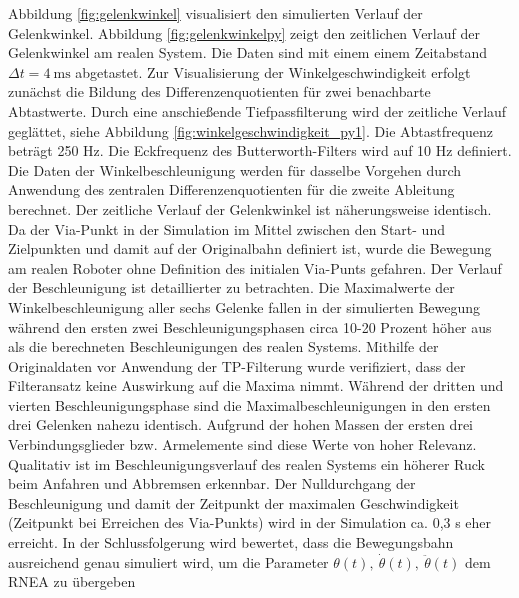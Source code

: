 Abbildung \ref{fig:gelenkwinkel}  visualisiert den simulierten  Verlauf der Gelenkwinkel. Abbildung \ref{fig:gelenkwinkelpy} zeigt den zeitlichen Verlauf der Gelenkwinkel am realen System. Die Daten sind mit einem einem  Zeitabstand $\Delta t = 4~\text{ms}$ abgetastet. Zur Visualisierung der Winkelgeschwindigkeit  erfolgt zunächst die Bildung des Differenzenquotienten für zwei benachbarte Abtastwerte. Durch eine anschießende Tiefpassfilterung wird der zeitliche Verlauf geglättet, siehe Abbildung \ref{fig:winkelgeschwindigkeit_py1}. Die Abtastfrequenz beträgt 250 Hz. Die Eckfrequenz des Butterworth-Filters wird auf 10 Hz definiert. Die Daten der Winkelbeschleunigung werden für dasselbe Vorgehen durch Anwendung des zentralen Differenzenquotienten für die zweite Ableitung berechnet. Der zeitliche Verlauf der Gelenkwinkel ist näherungsweise identisch. Da der Via-Punkt in der Simulation im Mittel zwischen den Start- und Zielpunkten und damit auf der Originalbahn definiert ist, wurde die Bewegung am realen Roboter ohne Definition des initialen Via-Punts gefahren. Der Verlauf der Beschleunigung ist detaillierter zu betrachten. Die Maximalwerte der Winkelbeschleunigung aller sechs Gelenke fallen in der simulierten Bewegung während den ersten zwei Beschleunigungsphasen circa 10-20 Prozent höher aus als die berechneten Beschleunigungen des realen Systems. Mithilfe der Originaldaten vor Anwendung der TP-Filterung wurde verifiziert, dass der Filteransatz keine Auswirkung auf die Maxima nimmt. Während der dritten und vierten Beschleunigungsphase sind die Maximalbeschleunigungen in den ersten drei Gelenken nahezu identisch. Aufgrund der hohen  Massen der ersten drei Verbindungsglieder bzw. Armelemente sind diese Werte von hoher Relevanz. Qualitativ ist im Beschleunigungsverlauf des realen Systems ein höherer Ruck beim Anfahren und Abbremsen erkennbar. Der Nulldurchgang der Beschleunigung und damit der Zeitpunkt der maximalen Geschwindigkeit (Zeitpunkt bei Erreichen des Via-Punkts) wird in der Simulation ca. 0,3 s eher erreicht. In der Schlussfolgerung wird bewertet, dass die Bewegungsbahn ausreichend genau simuliert wird, um die Parameter  $\theta(t), ~\dot{\theta}(t), ~\ddot{\theta}(t)$ dem RNEA zu übergeben


